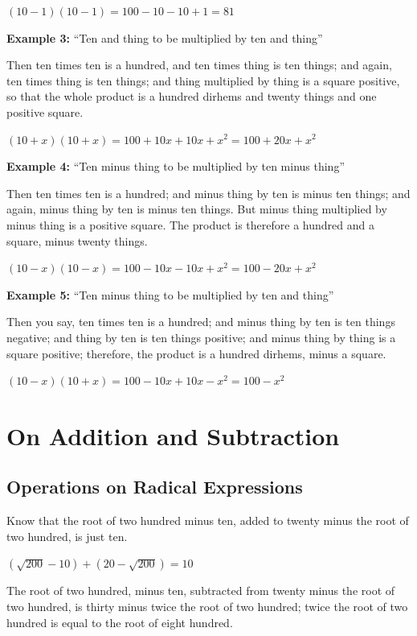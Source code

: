 \documentclass[11pt,a4paper]{book}
\begin{document}
$(10 - 1)(10 - 1) = 100 - 10 - 10 + 1 = 81$

\textbf{Example 3:} ``Ten and thing to be multiplied by ten and thing''

Then ten times ten is a hundred, and ten times thing is ten things; and
again, ten times thing is ten things; and thing multiplied by thing is a
square positive, so that the whole product is a hundred dirhems and twenty
things and one positive square.

$(10 + x)(10 + x) = 100 + 10x + 10x + x^2 = 100 + 20x + x^2$

\textbf{Example 4:} ``Ten minus thing to be multiplied by ten minus thing''

Then ten times ten is a hundred; and minus thing by ten is minus ten things;
and again, minus thing by ten is minus ten things. But minus thing
multiplied by minus thing is a positive square. The product is therefore a
hundred and a square, minus twenty things.

$(10 - x)(10 - x) = 100 - 10x - 10x + x^2 = 100 - 20x + x^2$

\textbf{Example 5:} ``Ten minus thing to be multiplied by ten and thing''

Then you say, ten times ten is a hundred; and minus thing by ten is ten
things negative; and thing by ten is ten things positive; and minus thing by
thing is a square positive; therefore, the product is a hundred dirhems,
minus a square.

$(10 - x)(10 + x) = 100 - 10x + 10x - x^2 = 100 - x^2$

\newpage

\chapter{On Addition and Subtraction}
\label{ch:addition}

\section{Operations on Radical Expressions}

Know that the root of two hundred minus ten, added to twenty minus the root
of two hundred, is just ten.

$(\sqrt{200} - 10) + (20 - \sqrt{200}) = 10$

The root of two hundred, minus ten, subtracted from twenty minus the root of
two hundred, is thirty minus twice the root of two hundred; twice the root of
two hundred is equal to the root of eight hundred.
\end{document}
